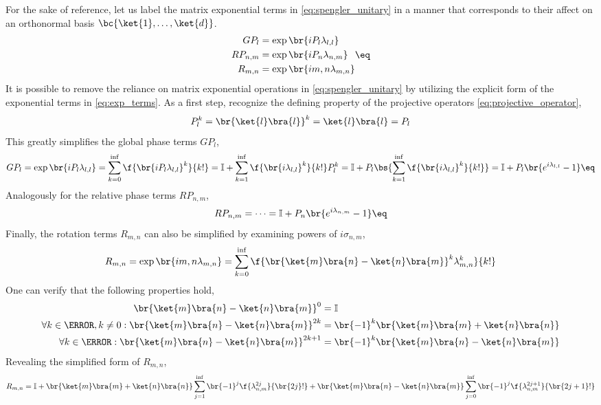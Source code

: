 \documentclass[aps, 10pt, english, twoside, pra, nofootinbib, longbibliography]{revtex4-1}
\begin{document}
    For the sake of reference, let us label the matrix exponential terms in \cref{eq:spengler_unitary} in a manner that corresponds to their affect on an orthonormal basis $\bc{\ket{1}, \ldots, \ket{d}}$.
    \begin{align}
    \begin{split}
        GP_l &= \exp\br{iP_l \lambda_{l,l}} \\
        RP_{n,m} &= \exp\br{i P_n \lambda_{n,m}} \\
        R_{m,n} &= \exp\br{i \si_{m,n} \lambda_{m,n}}
    \end{split} \eq \label{eq:exp_terms}
    \end{align}
    It is possible to remove the reliance on matrix exponential operations in \cref{eq:spengler_unitary} by utilizing the explicit form of the exponential terms in \cref{eq:exp_terms}. As a first step, recognize the defining property of the projective operators \cref{eq:projective_operator},
    \[ P_l^k = \br{\ket{l}\bra{l}}^k = \ket{l}\bra{l} = P_l \]
    This greatly simplifies the global phase terms $GP_l$,
    \[ GP_l = \exp\br{iP_l \lambda_{l,l}} = \sum_{k=0}^{\inf} \f{\br{iP_l \lambda_{l,l}}^k}{k!} = \mathbb{I} + \sum_{k=1}^{\inf} \f{\br{i \lambda_{l,l}}^k}{k!}P_l^k = \mathbb{I} + P_l \bs{\sum_{k=1}^{\inf} \f{\br{i \lambda_{l,l}}^k}{k!}} = \mathbb{I} + P_l \br{e^{i \lambda_{l,l}} - 1} \eq \label{eq:unitary_GP} \]
    Analogously for the relative phase terms $RP_{n,m}$,
    \[ RP_{n,m} = \cdots = \mathbb{I} + P_n \br{e^{i \lambda_{n,m}} - 1} \eq \label{eq:unitary_RP} \]
    Finally, the rotation terms $R_{m,n}$ can also be simplified by examining powers of $i \sigma_{n,m}$,
    \[ R_{m,n} = \exp\br{i \si_{m,n} \lambda_{m,n}} = \sum_{k=0}^{\inf} \f{\br{\ket{m}\bra{n} - \ket{n}\bra{m}}^k \lambda_{m,n}^k}{k!} \]
    One can verify that the following properties hold,
    \begin{align*}
        \br{\ket{m}\bra{n} - \ket{n}\bra{m}}^0 &= \mathbb{I} \\
        \forall k \in \N, k \neq 0 : \br{\ket{m}\bra{n} - \ket{n}\bra{m}}^{2k} &= \br{-1}^k\br{\ket{m}\bra{m} + \ket{n}\bra{n}} \\
        \forall k \in \N : \br{\ket{m}\bra{n} - \ket{n}\bra{m}}^{2k+1} &= \br{-1}^k\br{\ket{m}\bra{n} - \ket{n}\bra{m}}
    \end{align*}
    Revealing the simplified form of $R_{m,n}$,
    \[ R_{m,n} = \mathbb{I} + \br{\ket{m}\bra{m} + \ket{n}\bra{n}} \sum_{j=1}^{\inf} \br{-1}^j\f{\lambda_{n,m}^{2j}}{\br{2j}!} + \br{\ket{m}\bra{n} - \ket{n}\bra{m}} \sum_{j=0}^{\inf} \br{-1}^j\f{\lambda_{n,m}^{2j+1}}{\br{2j+1}!} \]
\end{document}

